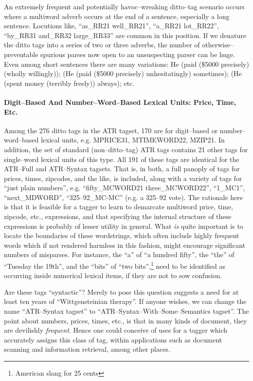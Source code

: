An extremely frequent and potentially havoc--wreaking ditto--tag
scenario occurs where a multiword adverb occurs at the end of a
sentence, especially a long sentence. Locutions like, ``as\_RR21
well\_RR21'', ``a\_RR21 lot\_RR22'', ``by\_RR31 and\_RR32
large\_RR33'' are common in this position. If we denature the ditto
tags into a series of two or three adverbs, the number of
otherwise--preventable spurious parses now open to an unsuspecting
parser can be huge. Even among short sentences there are many
variations: He (paid (\$5000 precisely) (wholly willingly)); (He (paid
(\$5000 precisely) unhesitatingly) sometimes); (He (spent money
(terribly freely)) always); etc.

\paragraph{Digit--Based And Number--Word--Based Lexical Units: Price, Time, Etc.}

Among the 276 ditto tags in the ATR tagset, 170 are for digit--based
or number--word--based lexical units, e.g. MPRICE31, MTIMEWORD22,
MZIP21. In addition, the set of standard (non--ditto--tag) ATR tags
contains 21 other tags for single--word lexical units of this type. 
All 191 of these tags are identical for the ATR--Full and ATR--Syntax
tagsets. That is, in both, a full panoply of tags for prices, times,
zipcodes, and the like, is included, along with a variety of tags for
``just plain numbers'', e.g. ``fifty\_MCWORD21 three\_MCWORD22'', ``1\_MC1'',
``next\_MDWORD'', ``325--92\_MC-MC'' (e.g. a 325--92 vote). The rationale here
is that it is feasible for a tagger to learn to demarcate
multiword price, time, zipcode, etc., expressions, and that specifying
the internal structure of these expressions is probably of lesser
utility in general. What {\em is} quite important is to locate the
boundaries of these wordstrings, which often include highly frequent
words which if not rendered harmless in this fashion, might encourage
significant numbers of misparses. For instance, the ``a'' of ``a
hundred fifty'', the ``the'' of ``Tuesday the 19th'', and the ``bits''
of ``two bits'',\footnote{American slang for 25 cents} need to be
identified as occurring inside numerical lexical items, if they are
not to sow confusion.

Are these tags ``syntactic''? Merely to pose this question suggests a
need for at least ten years of ``Wittgensteinian therapy''. If anyone
wishes, we can change the name ``ATR--Syntax tagset'' to
``ATR--Syntax--With--Some--Semantics tagset''. The point about
numbers, prices, times, etc., is that in many kinds of document, they
are devilishly {\em frequent}. Hence one could conceive of uses for a
tagger which accurately assigns this class of tag, within applications
such as document scanning and information retrieval, among other
places.

